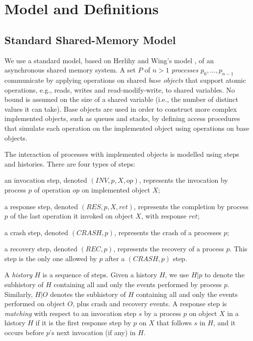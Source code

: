 
\section{Model and Definitions}
\label{section: Model}

\subsection{Standard Shared-Memory Model}

We use a standard model, based on Herlihy and Wing's model \cite{herlihyWingLinearizability}, of an asynchronous shared memory system. A set $P$ of $n > 1$ \textit{processes} $p_0, \ldots, p_{n-1}$ communicate by applying operations on shared \textit{base objects} that support atomic operations, e.g., reads, writes and read-modify-write, to shared variables. No bound is assumed on the size of a shared variable (i.e., the number of distinct values it can take).
Base objects are used in order to construct more complex implemented objects, such as queues and stacks, by defining access procedures that simulate each operation on the implemented object using operations on base objects.

The interaction of processes with implemented objects is modelled using steps and histories. There are four types of steps:
\begin{inparaenum}[(1)]
	\item an invocation step, denoted $(INV, p, X, op)$, represents the invocation by process $p$ of operation $op$ on implemented object $X$;
	\item a response step, denoted $(RES, p, X, ret)$, represents the completion by process $p$ of the last operation it invoked on object $X$, with response $ret$;
	\item a crash step, denoted $(CRASH, p)$, represents the crash of a processes $p$;
	\item a recovery step, denoted $(REC, p)$, represents the recovery of a process $p$. This step is the only one allowed by $p$ after a $(CRASH, p)$ step.
\end{inparaenum}

A \textit{history} $H$ is a sequence of steps. Given a history $H$, we use $H | p$ to denote the subhistory of $H$ containing all and only the events performed by process $p$. Similarly, $H | O$ denotes the subhistory of $H$ containing all and only the events performed on object $O$, plus crash and recovery events.
A response step is \textit{matching} with respect to an invocation step $s$ by a process $p$ on object $X$ in a history $H$ if it is the first response step by $p$ on $X$ that follows $s$ in $H$, and it occurs before $p$'s next invocation (if any) in $H$.

